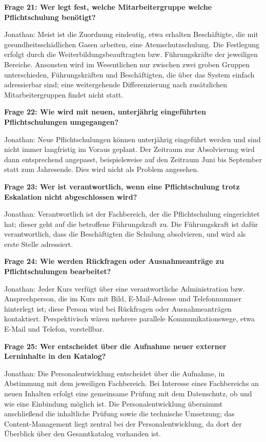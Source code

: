 \documentclass[
    12pt, 
    a4paper,
    ]{scrartcl} %
\begin{document}
\bigskip
{}

\textbf{Frage 21: Wer legt fest, welche Mitarbeitergruppe welche Pflichtschulung ben\"otigt?}

Jonathan: Meist ist die Zuordnung eindeutig, etwa erhalten Besch\"aftigte, die mit gesundheitssch\"adlichen Gasen arbeiten, eine Atemschutzschulung. Die Festlegung erfolgt durch die Weiterbildungsbeauftragten bzw. F\"uhrungskr\"afte der jeweiligen Bereiche. Ansonsten wird im Wesentlichen nur zwischen zwei groben Gruppen unterschieden, F\"uhrungskr\"aften und Besch\"aftigten, die \"uber das System einfach adressierbar sind; eine weitergehende Differenzierung nach zus\"atzlichen Mitarbeitergruppen findet nicht statt.

\medskip
\textbf{Frage 22: Wie wird mit neuen, unterj\"ahrig eingef\"uhrten Pflichtschulungen umgegangen?}

Jonathan: Neue Pflichtschulungen k\"onnen unterj\"ahrig eingef\"uhrt werden und sind nicht immer langfristig im Voraus geplant. Der Zeitraum zur Absolvierung wird dann entsprechend angepasst, beispielsweise auf den Zeitraum Juni bis September statt zum Jahresende. Dies wird nicht als Problem angesehen.

\medskip
\textbf{Frage 23: Wer ist verantwortlich, wenn eine Pflichtschulung trotz Eskalation nicht abgeschlossen wird?}

Jonathan: Verantwortlich ist der Fachbereich, der die Pflichtschulung eingerichtet hat; dieser geht auf die betroffene F\"uhrungskraft zu. Die F\"uhrungskraft ist daf\"ur verantwortlich, dass die Besch\"aftigten die Schulung absolvieren, und wird als erste Stelle adressiert.

\medskip
\textbf{Frage 24: Wie werden R\"uckfragen oder Ausnahmeantr\"age zu Pflichtschulungen bearbeitet?}

Jonathan: Jeder Kurs verf\"ugt \"uber eine verantwortliche Administration bzw. Ansprechperson, die im Kurs mit Bild, E-Mail-Adresse und Telefonnummer hinterlegt ist; diese Person wird bei R\"uckfragen oder Ausnahmeantr\"agen kontaktiert. Perspektivisch w\"aren mehrere parallele Kommunikationswege, etwa E-Mail und Telefon, vorstellbar.

\bigskip
{}

\textbf{Frage 25: Wer entscheidet \"uber die Aufnahme neuer externer Lerninhalte in den Katalog?}

Jonathan: Die Personalentwicklung entscheidet \"uber die Aufnahme, in Abstimmung mit dem jeweiligen Fachbereich. Bei Interesse eines Fachbereichs an neuen Inhalten erfolgt eine gemeinsame Pr\"ufung mit dem Datenschutz, ob und wie eine Einbindung m\"oglich ist. Die Personalentwicklung \"ubernimmt anschlie{\ss}end die inhaltliche Pr\"ufung sowie die technische Umsetzung; das Content-Management liegt zentral bei der Personalentwicklung, da dort der \"Uberblick \"uber den Gesamtkatalog vorhanden ist.
\end{document}
